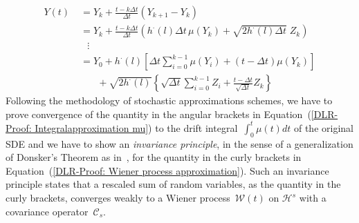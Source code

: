\begin{align}
    Y(t) & \; = Y_k + \frac{t - k \Delta t}{\Delta t} (Y_{k+1} - Y_k) \nonumber  \\
    & \; = Y_k + \frac{t - k \Delta t}{\Delta t} (h^{\cdot}(l) \Delta t \, \mu(Y_k) +\sqrt{2h^{\cdot}(l) \Delta t } \; Z_k ) \nonumber \\
    & \quad \vdots \nonumber \\
    & \; = Y_0 + h^{\cdot}(l) \left[ \Delta t \sum_{i=0}^{k-1} \mu(Y_i) + (t - \Delta t) \mu(Y_k) \right] \label{DLR-Proof: Integralapproximation mu} \\ 
    & \qquad + \sqrt{2 h^{\cdot}(l)} \left\{ \sqrt{ \Delta t} \sum_{i=0}^{k-1} Z_i +  \frac{t - \Delta t}{\sqrt{\Delta t}} Z_k \right\} \label{DLR-Proof: Wiener process approximation}
\end{align}
Following the methodology of stochastic approximations schemes, we have to prove convergence of the quantity in the angular brackets in Equation~(\ref{DLR-Proof: Integralapproximation mu}) to the drift integral~$\int_0^t \mu (t) dt$ of the original SDE and we have to show an \textit{invariance principle}, in the sense of a generalization of Donsker's Theorem as in~\autocite{Revuz2005}, for the quantity in the curly brackets in Equation~(\ref{DLR-Proof: Wiener process approximation}). Such an invariance principle states  that a rescaled sum of random variables, as the quantity in the curly brackets, converges weakly to a Wiener process~$\mathcal{W}(t)$ on $\mathcal{H}^s$ with a covariance operator~$\mathcal{C}_s$. 



